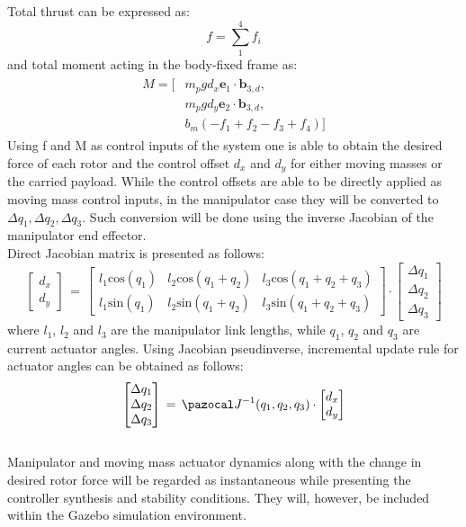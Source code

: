 Total thrust can be expressed as:
\begin{equation}
	f = \sum_{1}^{4}f_i
\end{equation}
and total moment acting in the body-fixed frame as:
\begin{align}
	\begin{split}
	M = [&m_{p}gd_x  \textbf{e}_1 \cdot \textbf{b}_{3,d} , \\
	&m_{p}gd_y \textbf{e}_2 \cdot \textbf{b}_{3,d}, \\
	&b_m(-f_1 + f_2 - f_3 + f_4)]
	\end{split}
\end{align}
Using f and M as control inputs of the system one is able to obtain the desired force of each rotor and the control offset $d_x$ and $d_y$ for either moving masses or the carried payload. While the control offsets are able to be directly applied as moving mass control inputs, in the manipulator case they will be converted to $\Delta q_1, \Delta q_2, \Delta q_3$. Such conversion will be done using the inverse Jacobian of the manipulator end effector.\\
Direct Jacobian matrix is presented as follows:
\begin{equation}
	\begin{bmatrix}
		d_x \\
		d_y
	\end{bmatrix}
	\, = \, 
	\begin{bmatrix}
		l_1\text{cos}(q_1) & l_2 \text{cos}(q_1 + q_2) & l_3 \text{cos}(q_1 + q_2 + q_3) \\
		l_1\text{sin}(q_1) & l_2 \text{sin}(q_1 + q_2) & l_3 \text{sin}(q_1 + q_2 + q_3) 
	\end{bmatrix}
	\cdot 
	\begin{bmatrix}
		\Delta q_1 \\
		\Delta q_2 \\
		\Delta q_3
	\end{bmatrix}
\end{equation}
where $l_1$, $l_2$ and $l_3$ are the manipulator link lengths, while $q_1$, $q_2$ and $q_3$ are current actuator angles. Using Jacobian pseudinverse, incremental update rule for actuator angles can be obtained as follows:
\begin{equation}
	\begin{bmatrix}
	\Delta q_1 \\
	\Delta q_2 \\
	\Delta q_3
	\end{bmatrix} 
	\, = \, \Ja^{-1} (q_1, q_2, q_3) \cdot
	\begin{bmatrix}
	d_x \\
	d_y
	\end{bmatrix}
\end{equation}
 \\
Manipulator and moving mass actuator dynamics along with the change in desired rotor force will be regarded as instantaneous while presenting the controller synthesis and stability conditions. They will, however, be included within the Gazebo simulation environment.